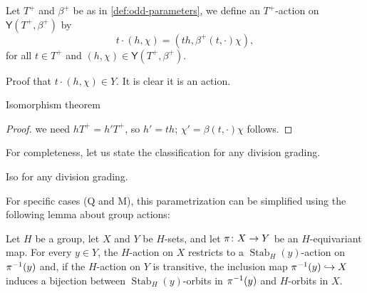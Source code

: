 \begin{defi}\label{def:T^+-action}
    Let $T^+$ and $\beta^+$ be as in \cref{def:odd-parameters}, we define an $T^+$-action on $\mathsf {Y} (T^+, \beta^+)$ by
    \[
        t \cdot (h, \chi) = (th, \beta^+(t, \cdot) \chi),
    \]
    for all $t\in T^+$ and $(h, \chi) \in \mathsf {Y} (T^+, \beta^+)$.
\end{defi}

Proof that $t \cdot (h, \chi) \in Y$. 
It is clear it is an action.

\begin{thm}
    Isomorphism theorem
\end{thm}

\begin{proof}
    we need $hT^+ = h'T^+$, so $h' = t h$; $\chi' = \beta(t, \cdot)\chi $ follows.
\end{proof}

For completeness, let us state the classification for any division grading. 

\begin{defi}
    
\end{defi}

\begin{cor}
    Iso for any division grading.
\end{cor}

For specific cases (Q and M), this parametrization can be simplified using the following lemma about group actions:


\begin{lemma}\label{lemma:lemma-on-actions}
    Let $H$ be a group, let $X$ and $Y$ be $H$-sets, and let $\pi\colon X \to Y$ be an $H$-equivariant map. 
    For every $y \in Y$, the $H$-action on $X$ restricts to a $\operatorname{Stab}_H (y)$-action on $\pi^{-1}(y)$ and, if the $H$-action on $Y$ is transitive, the inclusion map $\pi^{-1}(y) \hookrightarrow X$ induces a bijection between $\operatorname{Stab}_H (y)$-orbits in $\pi^{-1}(y)$ and $H$-orbits in $X$.  
\end{lemma}

